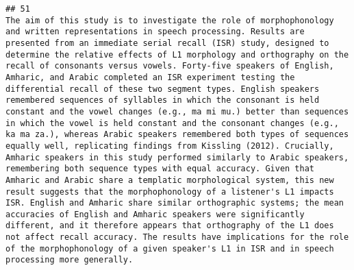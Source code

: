 \documentclass[
  english,
  man]{apa6}
\begin{document}
\begin{verbatim}
## 51                                                                                                                                                                                                                                                                                                                                                                                                                                                                                                                                                                                                                                                                                                                                                                                                                                                                                                                                                                                                                                                                                                                                                                         The aim of this study is to investigate the role of morphophonology and written representations in speech processing. Results are presented from an immediate serial recall (ISR) study, designed to determine the relative effects of L1 morphology and orthography on the recall of consonants versus vowels. Forty-five speakers of English, Amharic, and Arabic completed an ISR experiment testing the differential recall of these two segment types. English speakers remembered sequences of syllables in which the consonant is held constant and the vowel changes (e.g., ma mi mu.) better than sequences in which the vowel is held constant and the consonant changes (e.g., ka ma za.), whereas Arabic speakers remembered both types of sequences equally well, replicating findings from Kissling (2012). Crucially, Amharic speakers in this study performed similarly to Arabic speakers, remembering both sequence types with equal accuracy. Given that Amharic and Arabic share a templatic morphological system, this new result suggests that the morphophonology of a listener's L1 impacts ISR. English and Amharic share similar orthographic systems; the mean accuracies of English and Amharic speakers were significantly different, and it therefore appears that orthography of the L1 does not affect recall accuracy. The results have implications for the role of the morphophonology of a given speaker's L1 in ISR and in speech processing more generally.

\end{verbatim}
\end{document}
